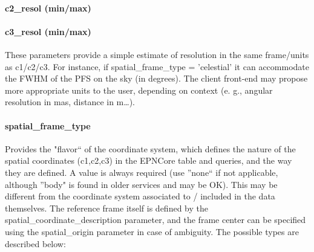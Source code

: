 \documentclass[11pt,a4paper]{ivoa}
\begin{document}
\paragraph{c2\_resol (min/max)}

\paragraph{c3\_resol (min/max)}

These parameters provide a simple estimate of resolution in the same frame/units as c1/c2/c3. For instance, if spatial\_frame\_type = 'celestial' it can accommodate the FWHM of the PFS on the sky (in degrees). The client front-end may propose more appropriate units to the user, depending on context (e. g., angular resolution in mas, distance in m…).

\paragraph{spatial\_frame\_type}

Provides the "flavor`` of the coordinate system, which defines the nature of the spatial coordinates (c1,c2,c3) in the EPNCore table and queries, and the way they are defined. A value is always required (use ''none`` if not applicable, although ''body" is found in older services and may be OK). This may be different from the coordinate system associated to / included in the data themselves. The reference frame itself is defined by the spatial\_coordinate\_description parameter, and the frame center can be specified using the spatial\_origin parameter in case of ambiguity. The possible types are described below:
\end{document}
